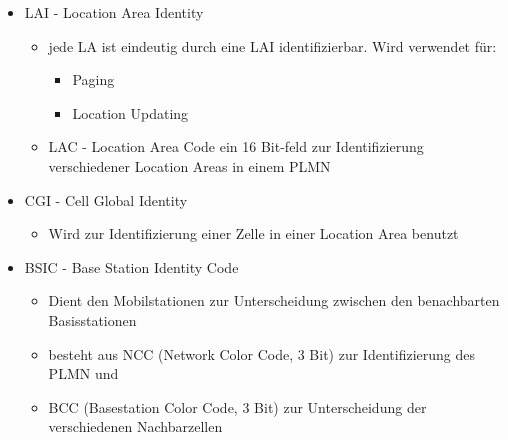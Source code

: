 \begin{minipage}{0.6 \linewidth}
\begin{itemize}
\item LAI - Location Area Identity
\begin{itemize}
\item jede LA ist eindeutig durch eine LAI identifizierbar. Wird verwendet für:
\begin{itemize}
\item Paging
\item Location Updating
\end{itemize}
\item LAC - Location Area Code ein 16 Bit-feld zur Identifizierung verschiedener Location Areas in einem PLMN
\end{itemize}
\item CGI - Cell Global Identity
\begin{itemize}
\item Wird zur Identifizierung einer Zelle in einer Location Area benutzt
\end{itemize}
\item BSIC - Base Station Identity Code
\begin{itemize}
\item Dient den Mobilstationen zur Unterscheidung zwischen den benachbarten Basisstationen
\item besteht aus NCC (Network Color Code, 3 Bit) zur Identifizierung des PLMN und 
\item BCC (Basestation Color Code, 3 Bit) zur Unterscheidung der verschiedenen Nachbarzellen 
\end{itemize}
\end{itemize}
\end{minipage}
